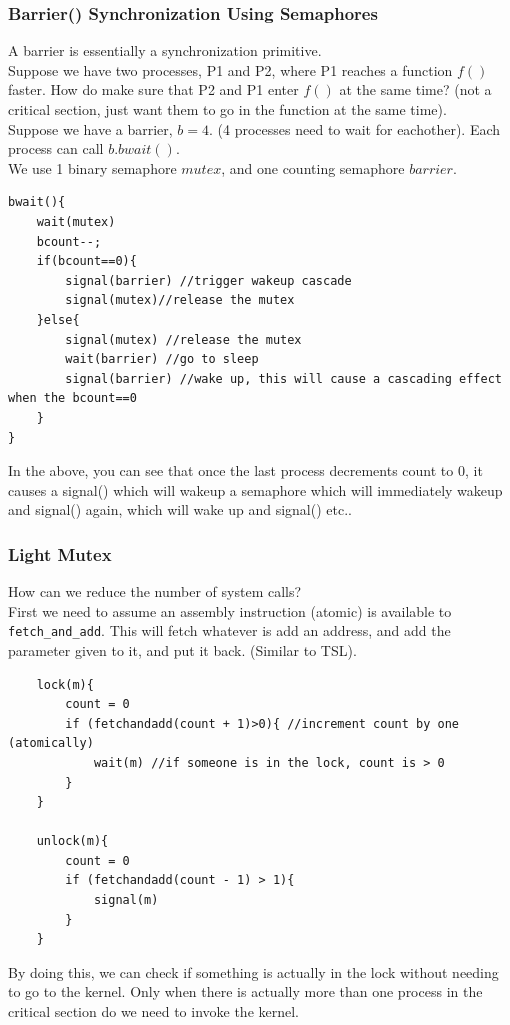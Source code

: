 \documentclass[12pt]{article}
\theoremstyle{definition}
\begin{document}
\subsubsection{Barrier() Synchronization Using Semaphores}
A barrier is essentially a synchronization primitive.
\\ \linebreak
Suppose we have two processes, P1 and P2, where P1 reaches a function $f()$ faster. How do make sure that P2 and P1 enter $f()$ at the same time? (not a critical section, just want them to go in the function at the same time). 
\\ \linebreak
Suppose we have a barrier, $b=4$. (4 processes need to wait for eachother). Each process can call $b.bwait()$.
\\ \linebreak
We use 1 binary semaphore $mutex$, and one counting semaphore $barrier$.
\\ \linebreak
\begin{lstlisting}
bwait(){
	wait(mutex)
	bcount--;
	if(bcount==0){
		signal(barrier) //trigger wakeup cascade
		signal(mutex)//release the mutex
	}else{
		signal(mutex) //release the mutex
		wait(barrier) //go to sleep
		signal(barrier) //wake up, this will cause a cascading effect when the bcount==0
	}
}
\end{lstlisting}
In the above, you can see that once the last process decrements count to 0, it causes a signal() which will wakeup a semaphore which will immediately wakeup and signal() again, which will wake up and signal() etc..
\\ \linebreak

\subsubsection{Light Mutex}
How can we reduce the number of system calls?
\\ \linebreak
First we need to assume an assembly instruction (atomic) is available to \texttt{fetch\_and\_add}. This will fetch whatever is add an address, and add the parameter given to it, and put it back. (Similar to TSL). \\
\begin{lstlisting}
	lock(m){
		count = 0
		if (fetchandadd(count + 1)>0){ //increment count by one (atomically)
			wait(m) //if someone is in the lock, count is > 0
		}
	}
	
	unlock(m){
		count = 0
		if (fetchandadd(count - 1) > 1){
			signal(m)
		}
	}
\end{lstlisting}
By doing this, we can check if something is actually in the lock without needing to go to the kernel. Only when there is actually more than one process in the critical section do we need to invoke the kernel.
\\ \linebreak
\end{document}
